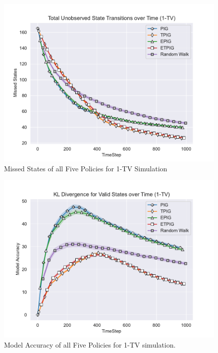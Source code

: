 \documentclass[12pt]{thesis}
\begin{document}
\begin{figure}[p]
	\begin{center}
		\includegraphics[scale=0.8]{"images/Missed_States_1-TV.pdf"}
	\end{center}
	\caption{Missed States of all Five Policies for 1-TV Simulation}
	\label{Fig:MSFP1TV}
\end{figure}
\begin{figure}
	\begin{center}
		\includegraphics[scale=0.8]{"images/Model_Accuracy_1-TV.pdf"}
	\end{center}
	\caption{Model Accuracy of all Five Policies for 1-TV simulation.}
	\label{Fig:MAFP1TV}
\end{figure}
\end{document}
